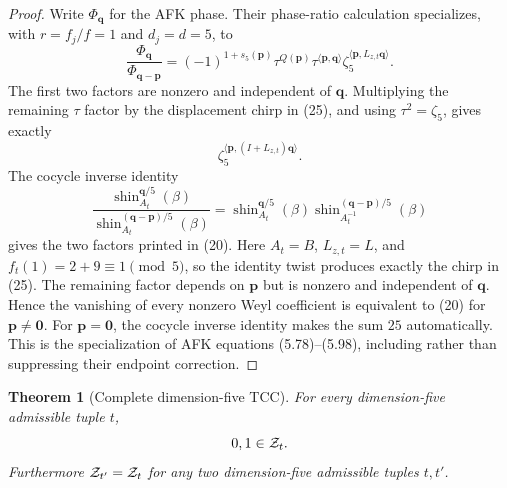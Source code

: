 \documentclass[11pt]{article}
\newtheorem{theorem}{Theorem}
\begin{document}
\begin{proof}
Write $\Phi_{\boldsymbol q}$ for the AFK phase.  Their phase-ratio
calculation specializes, with $r=f_j/f=1$ and $d_j=d=5$, to
\[
 \frac{\Phi_{\boldsymbol q}}
 {\Phi_{\boldsymbol q-\boldsymbol p}}
 =
 (-1)^{1+s_5(\boldsymbol p)}
 \tau^{Q(\boldsymbol p)}
 \tau^{\langle\boldsymbol p,\boldsymbol q\rangle}
 \zeta_5^{\langle\boldsymbol p,L_{z,t}\boldsymbol q\rangle}.
\tag{26}
\]
The first two factors are nonzero and independent of
$\boldsymbol q$.  Multiplying the remaining $\tau$ factor by the
displacement chirp in (25), and using $\tau^2=\zeta_5$, gives exactly
\[
 \zeta_5^{\langle\boldsymbol p,
 (I+L_{z,t})\boldsymbol q\rangle}.
\]
The cocycle inverse identity
\[
 \frac{\operatorname{shin}_{A_t}^{\boldsymbol q/5}(\beta)}
 {\operatorname{shin}_{A_t}^{(\boldsymbol q-\boldsymbol p)/5}(\beta)}
 =
 \operatorname{shin}_{A_t}^{\boldsymbol q/5}(\beta)
 \operatorname{shin}_{A_t^{-1}}^{
   (\boldsymbol q-\boldsymbol p)/5}(\beta)
\tag{27}
\]
gives the two factors printed in (20).  Here
$A_t=B$, $L_{z,t}=L$, and
$f_t(1)=2+9\equiv1\pmod5$, so the identity twist produces exactly the
chirp in (25).  The remaining factor depends on
$\boldsymbol p$ but is nonzero and independent of
$\boldsymbol q$.  Hence the vanishing of every nonzero Weyl coefficient
is equivalent to (20) for $\boldsymbol p\ne\boldsymbol0$.
For $\boldsymbol p=\boldsymbol0$, the cocycle inverse identity makes
the sum $25$ automatically.  This is the specialization of AFK
equations (5.78)--(5.98), including rather than suppressing their
endpoint correction.
\end{proof}

\begin{theorem}[Complete dimension-five TCC]\label{thm:tcc}
For every dimension-five admissible tuple $t$,
\[
 0,1\in{\cal Z}_t.
\]
Furthermore ${\cal Z}_{t'}={\cal Z}_t$ for any two dimension-five
admissible tuples $t,t'$.
\end{theorem}
\end{document}
